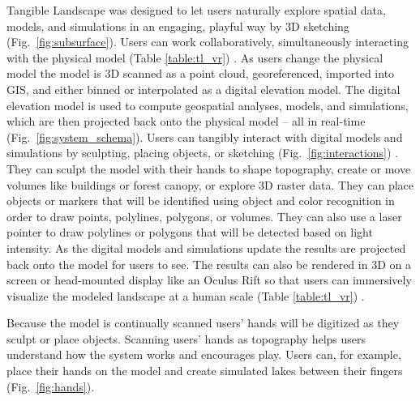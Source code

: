 \documentclass[prodmode,acmtochi]{acmsmall} %
\begin{document}
Tangible Landscape was designed to let users naturally explore 
spatial data, models, and simulations in an engaging, playful way
by 3D sketching (Fig.~\ref{fig:subsurface}). 
Users can work collaboratively, 
simultaneously interacting with the physical model
(Table \ref{table:tl_vr}) \cite{Tabrizian2016}. 
As users change the physical model
the model is 3D scanned as a point cloud, georeferenced, imported into GIS, 
and either binned or interpolated as a digital elevation model. 
The digital elevation model is used to compute 
geospatial analyses, models, and simulations, 
which are then projected back onto the physical model 
-- all in real-time (Fig.~\ref{fig:system_schema}). 
Users can tangibly interact with digital models and simulations
by sculpting, placing objects, or sketching (Fig.~\ref{fig:interactions}) .
They can sculpt the model with their hands
to shape topography, 
create or move volumes
like buildings or forest canopy, 
or explore 3D raster data.  
They can place objects or markers 
that will be identified using object and color recognition
in order to draw points, polylines, polygons, or volumes. 
They can also use a laser pointer to draw polylines or polygons
that will be detected based on light intensity. 
As the digital models and simulations update
the results are projected back onto the model for users to see. 
The results can also be rendered in 3D 
on a screen or head-mounted display like an Oculus Rift
so that users can immersively visualize the modeled landscape 
at a human scale 
(Table \ref{table:tl_vr}) \cite{Tabrizian2016}.

Because the model is continually scanned
users' hands will be digitized as they sculpt or place objects. 
Scanning users' hands as topography 
helps users understand how the system works
and encourages play. 
Users can, for example, 
place their hands on the model and create simulated lakes between their fingers
(Fig.~\ref{fig:hands}). %
\end{document}
